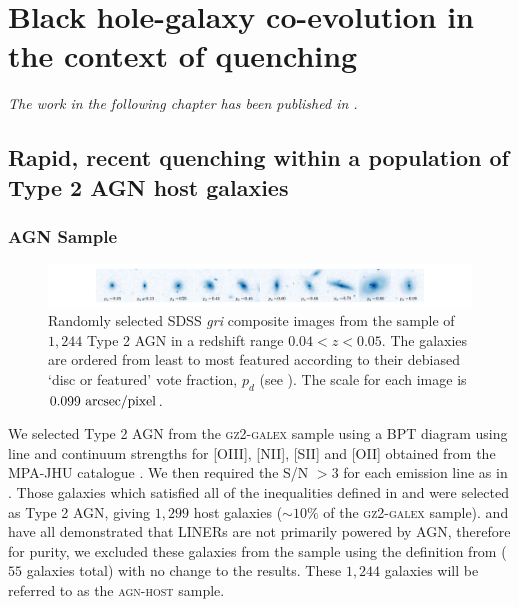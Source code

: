 
\chapter{Black hole-galaxy co-evolution in the context of quenching}

\emph{The work in the following chapter has been published in \citet{smethurst16}.}

\section{Rapid, recent quenching within a population of Type 2 AGN host galaxies}\label{agnfeedback}

\subsection{AGN Sample}\label{agnsample}
\begin{figure}
\includegraphics[width=\textwidth]{agn/fig1.pdf}
\caption[SDSS images of galaxies in the \textsc{agn-host} sample]{Randomly selected SDSS \emph{gri} composite images from the sample of $1,244$ Type 2 AGN in a redshift range $0.04 < z < 0.05$.  The galaxies are ordered from least to most featured according to their debiased `disc or featured' vote fraction, $p_d$ (see \citealt{GZ2}). The scale for each image is $0.099~\rm{arcsec/pixel}$.}
\label{mosaic}
\end{figure}


We selected Type 2 AGN from the \textsc{gz2-galex} sample using a BPT diagram \citep{bpt} using line and continuum strengths for [OIII], [NII], [SII] and [OII] obtained from the MPA-JHU catalogue \citep{kauffmann03, brinchmann04}. We then required the S/N $> 3$ for each emission line as in \cite{schawinski10a}. Those galaxies which satisfied all of the inequalities defined in \cite{kewley01} and \cite{kauffmann03b} were selected as Type 2 AGN, giving $1,299$ host galaxies ($\sim10\%$ of the \textsc{gz2-galex} sample). \cite{Sarzi10, yan12} and \cite{Singh13} have all demonstrated that LINERs are not primarily powered by AGN, therefore for purity, we excluded these galaxies from the sample using the definition from \cite{kewley06} ($55$ galaxies total) with no change to the results. These $1,244$ galaxies will be referred to as the \textsc{agn-host} sample. 

